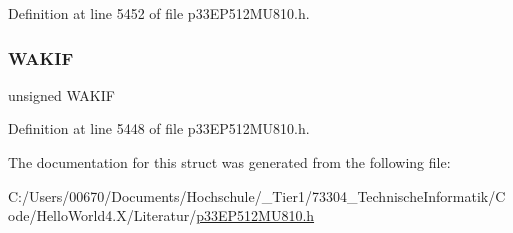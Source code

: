 Definition at line 5452 of file p33\+E\+P512\+M\+U810.\+h.

\mbox{\label{structtag_c2_i_n_t_f_b_i_t_s_aede7ce476b475e1cd66dffa184f2daa1}} 
\subsubsection{\texorpdfstring{W\+A\+K\+IF}{WAKIF}}
{\footnotesize\ttfamily unsigned W\+A\+K\+IF}



Definition at line 5448 of file p33\+E\+P512\+M\+U810.\+h.



The documentation for this struct was generated from the following file\+:\begin{DoxyCompactItemize}
\item 
C\+:/\+Users/00670/\+Documents/\+Hochschule/\+\_\+\+Tier1/73304\+\_\+\+Technische\+Informatik/\+Code/\+Hello\+World4.\+X/\+Literatur/\hyperlink{p33_e_p512_m_u810_8h}{p33\+E\+P512\+M\+U810.\+h}\end{DoxyCompactItemize}
